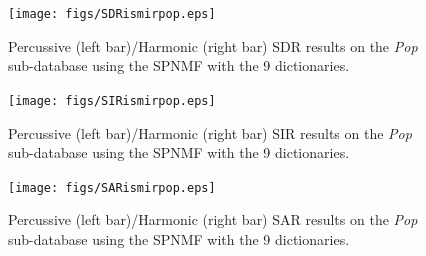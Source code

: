 \documentclass{article}
\begin{document}
\begin{figure}[h]

  \centering 
  \texttt{[image: figs/SDRismirpop.eps]}
  \caption{\label{sdrpop} Percussive (left bar)/Harmonic (right bar) SDR results on the \emph{Pop} sub-database using the SPNMF with the 9 dictionaries.}
  
\end{figure}\begin{figure}[h]

  \centering 
  \texttt{[image: figs/SIRismirpop.eps]}
  \caption{\label{sirpop} Percussive (left bar)/Harmonic (right bar) SIR results on the \emph{Pop} sub-database using the SPNMF with the 9 dictionaries.}
  
\end{figure}\begin{figure}[h]

  \centering 
  \texttt{[image: figs/SARismirpop.eps]}
  \caption{\label{sarpop} Percussive (left bar)/Harmonic (right bar) SAR results on the \emph{Pop} sub-database using the SPNMF with the 9 dictionaries.}
  
\end{figure}

%   
\end{document}
